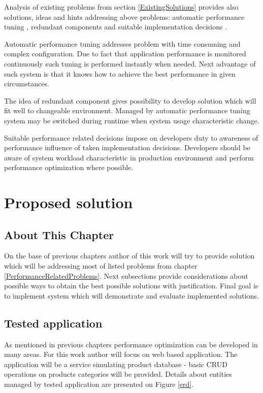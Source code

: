 \documentclass[10pt,a4paper]{article}
\begin{document}
Analysis of existing problems from section \ref{ExistingSolutions} provides also solutions, ideas and hints addressing above problems:
automatic performance tuning \cite{autotuning}\cite{autoarch}\cite{autoframework}, redundant components \cite{redundancycomponent} and suitable implementation decisions \cite{springperformance}. 

Automatic performance tuning addresses problem with time consuming and complex configuration. Due to fact that application performance is monitored continuously such tuning is performed instantly when needed. Next advantage of such system is that it knows how to achieve the best performance in given circumstances. 

The idea of redundant component gives possibility to develop solution which will fit well to changeable environment. Managed by automatic performance tuning system may be switched during runtime when system usage characteristic change. 

Suitable performance related decisions impose on developers duty to awareness of performance influence of taken implementation decisions. Developers should be aware of system workload characteristic in production environment and perform performance optimization where possible. 
 
\section{Proposed solution}

\subsection{About This Chapter}
On the base of previous chapters author of this work will try to provide solution which will be addressing most of listed problems from chapter \ref{PerformanceRelatedProblems}. Next subsections provide considerations about possible ways to obtain the best possible solutions with justification. Final goal is to implement system which will demonstrate and evaluate implemented solutions. 

\subsection{Tested application}  
As mentioned in previous chapters performance optimization can be developed in many areas. For this work author will focus on web based application. The application will be a service simulating product database - basic CRUD operations on products categories will be provided. Details about entities managed by tested application are presented on Figure \ref{erd}. 
\end{document}
